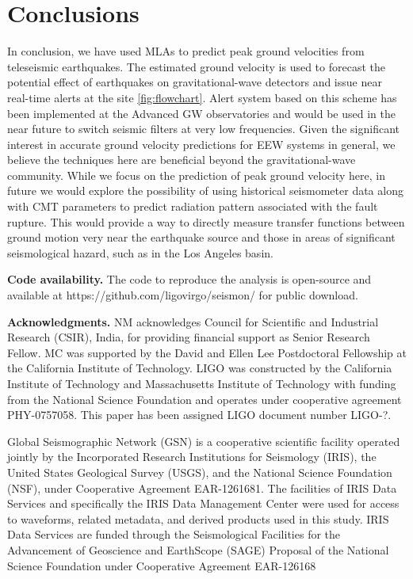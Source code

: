 \documentclass[twocolumn, aps, superscriptaddress]{revtex4}
\begin{document}
\section{Conclusions}
In conclusion, we have used MLAs to predict peak ground velocities from teleseismic earthquakes. The estimated ground velocity is used to forecast the potential effect of earthquakes on gravitational-wave detectors and issue near real-time alerts at the site \ref{fig:flowchart}. Alert system based on this scheme has been implemented at the Advanced GW observatories and would be used in the near future to switch seismic filters at very low frequencies. Given the significant interest in accurate ground velocity predictions for EEW systems in general, we believe the techniques here are beneficial beyond the gravitational-wave community.
While we focus on the prediction of peak ground velocity here, in future we would explore the possibility of using historical seismometer data along with CMT parameters to predict radiation pattern associated with the fault rupture.
This would provide a way to directly measure transfer functions between ground motion very near the earthquake source and those in areas of significant seismological hazard, such as in the Los Angeles basin.


\textbf{Code availability.}
The code to reproduce the analysis is open-source and available at https://github.com/ligovirgo/seismon/ for public download.

\textbf{Acknowledgments.}
NM acknowledges Council for Scientific and Industrial Research (CSIR), India, for providing financial support as Senior Research Fellow.  MC was supported by the David and Ellen Lee Postdoctoral Fellowship at the California Institute of Technology. LIGO was constructed by the California Institute of Technology and Massachusetts Institute of Technology with funding from the National Science Foundation and operates under cooperative agreement PHY-0757058.
This paper has been assigned LIGO document number LIGO-?.

Global Seismographic Network (GSN) is a cooperative scientific facility operated jointly by the Incorporated Research Institutions for Seismology (IRIS), the United States Geological Survey (USGS), and the National Science Foundation (NSF), under Cooperative Agreement EAR-1261681.
The facilities of IRIS Data Services and specifically the IRIS Data Management Center were used for access to waveforms, related metadata, and derived products used in this study. IRIS Data Services are funded through the Seismological Facilities for the Advancement of Geoscience and EarthScope (SAGE) Proposal of the National Science Foundation under Cooperative Agreement EAR-126168



\end{document}
